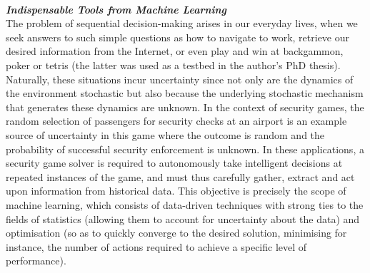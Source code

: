 \noindent \textbf{\textit{\\Indispensable Tools from Machine Learning}}\\
The problem of sequential decision-making arises in our everyday lives, when we seek answers to such simple questions as how to navigate to work, retrieve our desired information from the Internet, or even
play and win at backgammon, poker or tetris (the latter was used as a testbed in the author's PhD thesis). Naturally, these situations incur uncertainty since not only are the dynamics of the environment stochastic but also because the underlying stochastic mechanism that generates these dynamics are unknown.   
%
In the context of security games, the random selection of passengers for security checks at an airport is an example source of uncertainty in this game where the outcome is random and the probability of successful security enforcement  is unknown. In these applications, a security game solver is required to autonomously take intelligent decisions at repeated instances of the game, and must thus carefully gather, extract and act upon information from historical data. 
%
This objective is precisely the scope of machine learning, which consists of data-driven techniques with strong ties to the fields of statistics (allowing them to account for uncertainty about the data) and optimisation (so as to quickly converge to the desired solution, minimising for instance, the number of actions required to achieve a specific level of performance).   	




